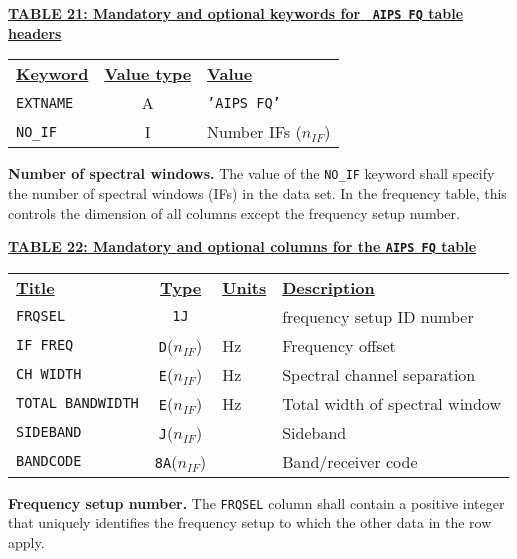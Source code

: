 \documentclass[twoside]{article}
\newcommand{\Me}[1]{\textcolor{mecol}{#1}}
\newcommand{\nif}{$n_{IF}$}
\begin{document}
\begin{center}
\underline{\bf{TABLE 21: Mandatory and optional keywords for {\tt
   AIPS FQ} table headers}}\\
\begin{tabular}{lcl}
\noalign{\vspace{2pt}} \label{ta:FQkeys}
\underline{{\bf Keyword}} & \underline{\bf{Value type}} &
    \underline{\bf{Value\vphantom{y}}} \\
\noalign{\vspace{2pt}}
{\tt EXTNAME}   & A & {\tt 'AIPS FQ'}  \\
{\tt NO\_IF}    & I & Number IFs (\nif)
\end{tabular}
\end{center}

{\bf Number of spectral windows.} The value of the {\tt NO\_IF}
keyword shall specify the number of spectral windows (IFs) in the data
set.  In the frequency table, this controls the dimension of all
columns except the frequency setup number.

\begin{center}
\underline{\bf{TABLE 22: Mandatory {\Me and optional} columns for the
    {\tt AIPS FQ} table}}\\
\begin{tabular}{lcll}
\noalign{\vspace{2pt}} \label{ta:FQcols}
\underline{{\bf Title\vphantom{y}}} & \underline{\bf{Type}} &
   \underline{{\bf Units\vphantom{y}}} & \underline{\bf{Description}} \\
\noalign{\vspace{2pt}}
{\tt FRQSEL}    & {\tt 1J} & & frequency setup ID number \\
{\tt IF FREQ}   & {\tt D}(\nif) & Hz & Frequency offset \\
{\tt CH WIDTH}  & {\tt E}(\nif) & Hz & Spectral channel separation \\
{\tt TOTAL BANDWIDTH} & {\tt E}(\nif) & Hz & Total width of spectral window \\
{\tt SIDEBAND}  & {\tt J}(\nif) &  & Sideband \\
\hline
{\tt \Me{BANDCODE}} & \Me{{\tt 8A}(\nif)} & & \Me{Band/receiver code}
\end{tabular}
\end{center}

{\bf Frequency setup number.} The {\tt FRQSEL} column shall contain a
positive integer that uniquely identifies the frequency setup to which
the other data in the row apply.
\end{document}
